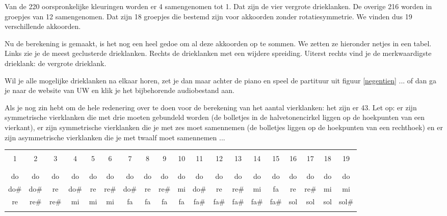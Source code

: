 \begin{multicols}{2}
Van de 220 oorspronkelijke kleuringen worden er 4 samengenomen tot 1. Dat zijn de vier vergrote drieklanken. De overige 216 worden in groepjes van 12 samengenomen. Dat zijn 18 groepjes die bestemd zijn voor akkoorden zonder rotatiesymmetrie. We vinden dus 19 verschillende akkoorden. 

Nu de berekening is gemaakt, is het nog een heel gedoe om al deze akkoorden op te sommen. We zetten ze hieronder netjes in een tabel. Links zie je de meest geclusterde drieklanken. Rechts de drieklanken met een wijdere spreiding. Uiterst rechts vind je de merkwaardigste drieklank: de vergrote drieklank. 

Wil je alle mogelijke drieklanken na elkaar horen, zet je dan maar achter de piano en speel de partituur uit figuur \ref{negentien} ... of dan ga je naar de website van UW en klik je het bijbehorende audiobestand aan.

Als je nog zin hebt om de hele redenering over te doen voor de berekening van het aantal vierklanken: het zijn er 43. Let op: er zijn symmetrische vierklanken die met drie moeten gebundeld worden (de bolletjes in de halvetonencirkel liggen op de hoekpunten van een vierkant), er zijn symmetrische vierklanken die je met zes moet samennemen (de bolletjes liggen op de hoekpunten van een rechthoek) en er zijn asymmetrische vierklanken die je met twaalf moet samennemen ...

\end{multicols}

\begin{center}
    \footnotesize
    \begin{tabular}{|ccccccccccccccccccc|}
    \hline
    &&&&&&&&&&&&&&&&&&\\
   1 & 2 & 3 & 4 & 5 & 6 & 7 & 8 & 9 & 10 & 11 & 12 &  13 & 14 & 15 & 16 & 17 & 18 & 19 \\ 
   &&&&&&&&&&&&&&&&&&\\
    \hline
    &&&&&&&&&&&&&&&&&&\\
    do & do & do & do & do & do & do & do & do & do & do & do &  do & do & do & do & do & do & do \\ 
    do$\#$ & do$\#$ & re & do$\#$ & re & re$\#$ & do$\#$ & re & re$\#$ & mi & do$\#$ & re &  re$\#$ & mi & fa & re & re$\#$ & mi & mi \\ 
    re & re$\#$ & re$\#$ & mi & mi & mi & fa & fa & fa & fa & fa$\#$ & fa$\#$ &  fa$\#$ & fa$\#$ & fa$\#$ & sol & sol & sol & sol$\#$ \\ 
    &&&&&&&&&&&&&&&&&&\\
    \hline
    \end{tabular}
\end{center}

